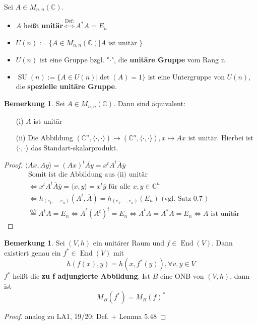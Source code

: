 \documentclass[a4paper, titlepage]{article}
\theoremstyle{definition}
\newtheorem{bem}[satz]{Bemerkung}
\newcommand{\C}{\mathbb{C}}
\begin{document}
\begin{definition}
	Sei $A\in M_{n,n}(\C).$ 
	\begin{itemize}
		\item $A$ heißt
		\textbf{unitär}$\overset{\text{Def:}}{\Leftrightarrow} A^*A=E_n $
		\item $U(n) :=\{ A \in M_{n,n}(\C) | A \text{ ist unitär }\}$
		\item $U(n)$ ist eine Gruppe bzgl. "$\cdot$", die \textbf{unitäre Gruppe} vom Rang n.
		\item $\operatorname{SU}(n) := \{ A \in U(n) | \operatorname{det}(A) = 1\}$ ist eine Untergruppe von $U(n)$, die \textbf{spezielle unitäre Gruppe}.
	\end{itemize}
\end{definition}
\begin{bem}
	Sei $A\in M_{n,n}(\C)$. Dann sind äquivalent:
	\begin{enumerate}
		\item[(i)] $A$ ist unitär 
		\item[(ii)]Die Abbildung $(\C^n, \langle \cdot, \cdot \rangle) \longrightarrow ( \C^n, \langle \cdot, \cdot \rangle), x \mapsto Ax$ ist unitär. Hierbei ist $\langle \cdot, \cdot \rangle $ das Standart-skalarprodukt.
	\end{enumerate}
\begin{proof}
	$\langle Ax, Ay\rangle = (Ax)^t\overline{Ay}=x^tA^t\overline{A}\overline{y}$
	\begin{align*}
	&\text{Somit ist die Abbildung aus (ii) unitär }\\
	&\Leftrightarrow x^tA^t\overline{A}\overline{y} = \langle x,y \rangle = x^t\overline{y} \text{ für alle } x,y\in \C^n\\
	&\Leftrightarrow h_{(e_1,...,e_n)}(A^t,\overline{A}) = h_{(e_1,...,e_n)}(E_n) \text{ (vgl. Satz 0.7 )}\\
	& \overset{0.7}{=} A^tA = E_n \Leftrightarrow \overline{A}^t(A^t)^t = E_n \Leftrightarrow \overline{A}^tA = A^{*}A=E_n \Leftrightarrow A \text{ ist unitär}
	\end{align*}	
\end{proof}
\end{bem}
\begin{bem}
	Sei $(V,h)$ ein unitärer Raum und $f \in \operatorname{End}(V).$ Dann existiert genau ein $f^{*}\in \operatorname{End}(V)$ mit 
	$$h(f(x),y) = h(x,f^{*}(y)), \forall v,y \in V$$
	$f^{*}$ heißt die \textbf{zu f adjungierte Abbildung}. Ist $B$ eine ONB von $(V,h)$, dann ist $$M_B(f^{*})=M_B(f)^{*}$$
	\begin{proof}
		analog zu LA1, 19/20; Def. + Lemma 5.48
	\end{proof}
\end{bem}
\end{document}
